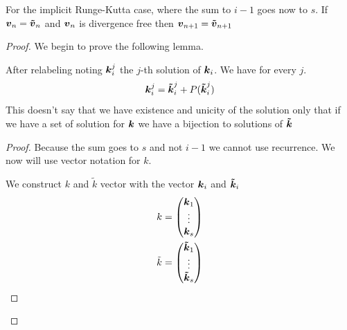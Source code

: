 \begin{theorem}
For the implicit Runge-Kutta case, where the sum to $i-1$ goes now to $s$.
If ${\boldsymbol {v}}_{n}={\boldsymbol {\tilde{v}}}_{n}$ and ${\boldsymbol {v}}_n$ is divergence free then ${\boldsymbol {v}}_{n+1}={\boldsymbol {\tilde{v}}}_{n+1}$ 
\end{theorem}
\begin{proof}
We begin to prove the following lemma.
\begin{lemma}
After relabeling noting ${\boldsymbol {k}}_{i}^{j}$ the $j$-th solution of ${\boldsymbol {k}}_{i}$.
We have for every $j$.
\begin{equation}
  {\boldsymbol {k}}_{i}^{j}={\boldsymbol {\tilde{k}}}_{i}^{j}+P({\boldsymbol {\tilde{k}}}_{i}^{j})
\end{equation}
This doesn't say that we have existence and unicity of the solution only that if we have a set of solution for ${\boldsymbol {k}}$ we have a bijection
to solutions of ${\boldsymbol {\tilde{k}}}$
\end{lemma}
\begin{proof}
Because the sum goes to $s$ and not $i-1$ we cannot use recurrence.
We now will use vector notation for $k$.

We construct $k$ and $\tilde{k}$ vector with the vector ${\boldsymbol {k}}_{i}$ and ${\boldsymbol {\tilde{k}}}_{i}$
\begin{align}
k&=\begin{pmatrix}
    {\boldsymbol {k}}_{1}\\
    \vdots\\
    {\boldsymbol {k}}_{s}\\
  \end{pmatrix}\\
\tilde{k}&=\begin{pmatrix}
    {\boldsymbol {\tilde{k}}}_{1}\\
    \vdots\\
    {\boldsymbol {\tilde{k}}}_{s}\\
  \end{pmatrix}
\end{align}


\end{proof}
\end{proof}
